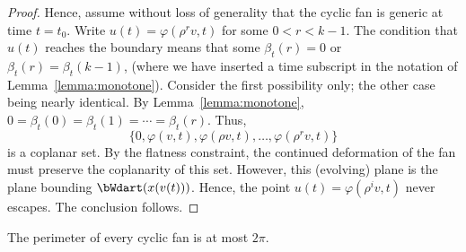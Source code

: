 \begin{proof}
Hence, assume without loss of generality that the cyclic fan is generic at time $t=t_0$. Write $u(t) = \varphi(\rho^r v,t)$ for some $0< r < k-1$.  The condition that $u(t)$ reaches the boundary means that some $\beta_t(r)=0$ or $\beta_t(r)=\beta_t(k-1)$, (where we have inserted a time subscript in the notation of Lemma~\ref{lemma:monotone}).  Consider the first possibility only; the other case being nearly identical.  By Lemma~\ref{lemma:monotone}, $0=\beta_t(0)=\beta_t(1)=\cdots=\beta_t(r)$.  Thus,
$$\{0,\varphi(v,t),\varphi(\rho v,t),\ldots,\varphi(\rho^r v,t)\}$$
is a coplanar set.  By the flatness constraint, the continued deformation of the fan must preserve the coplanarity of this set.  However, this (evolving) plane is the plane bounding $\bWdart(x(v(t)))$.  Hence, the point $u(t) = \varphi(\rho^iv ,t)$ never escapes. The conclusion follows.
\end{proof}






\begin{lemma}
 The perimeter of every cyclic fan is at most $2\pi$.
\end{lemma}
%
%

